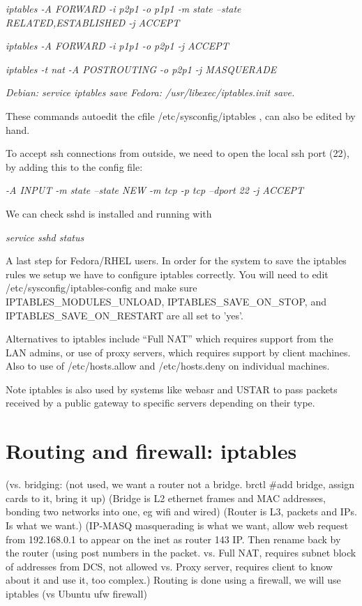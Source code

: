 \documentclass[oneside,english]{scrbook}
\begin{document}
\emph{iptables -A FORWARD -i p2p1 -o p1p1 -m state --state RELATED,ESTABLISHED
-j ACCEPT }

\emph{iptables -A FORWARD -i p1p1 -o p2p1 -j ACCEPT }

\emph{iptables -t nat -A POSTROUTING -o p2p1 -j MASQUERADE}

\emph{Debian: service iptables save Fedora: /usr/libexec/iptables.init
save.}

These commands autoedit the cfile /etc/sysconfig/iptables , can also
be edited by hand.

To accept ssh connections from outside, we need to open the local
ssh port (22), by adding this to the config file:

\emph{-A INPUT -m state --state NEW -m tcp -p tcp --dport 22 -j ACCEPT}

We can check sshd is installed and running with

\emph{service sshd status }

A last step for Fedora/RHEL users. In order for the system to save
the iptables rules we setup we have to configure iptables correctly.
You will need to edit /etc/sysconfig/iptables-config and make sure
IPTABLES\_MODULES\_UNLOAD, IPTABLES\_SAVE\_ON\_STOP, and IPTABLES\_SAVE\_ON\_RESTART
are all set to 'yes'.

Alternatives to iptables include ``Full NAT'' which requires support
from the LAN admins, or use of proxy servers, which requires support
by client machines. Also to use of /etc/hosts.allow and /etc/hosts.deny
on individual machines.

Note iptables is also used by systems like webasr and USTAR to pass
packets received by a public gateway to specific servers depending
on their type.

\section{Routing and firewall: iptables}

 (vs. bridging: (not used, we want a router not a bridge.  brctl    #add bridge, assign cards to it, bring it up)
 (Bridge is L2 ethernet frames and MAC addresses, bonding two networks into one, eg wifi and wired)
 (Router is L3, packets and IPs. Is what we want.)
 (IP-MASQ masquerading is what we want, allow web request from 192.168.0.1 to appear on the inet as router 143 IP. Then rename back by the router (using post numbers in the packet.
   vs. Full NAT, requires subnet  block of addresses from DCS, not allowed
   vs. Proxy server, requires client to know about it and use it, too complex.)
  Routing is done using a firewall, we will use iptables   (vs Ubuntu ufw firewall)
\end{document}
